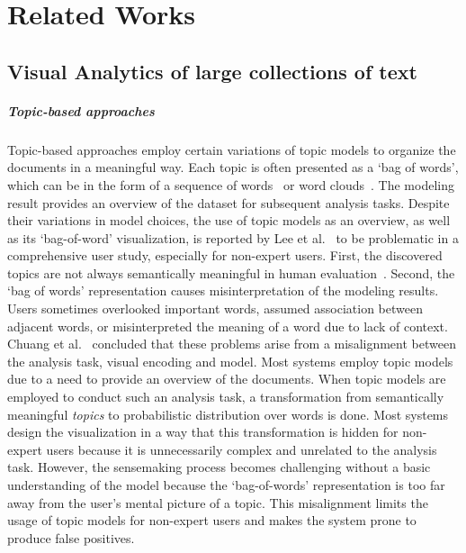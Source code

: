 \section{Related Works}
\subsection{Visual Analytics of large collections of text}
\subparagraph{Topic-based approaches} 
Topic-based approaches employ certain variations of topic models to organize the documents in a meaningful way.
Each topic is often presented as a `bag of words', which can be in the form of a sequence of words~\cite{yang2017vistopic, cho2016vairoma, dou2013hierarchicaltopics,yan2019clfsemi,han2022hisva, alexander2014serendip, lee2012ivisclustering} or word clouds~\cite{oelke2014topiccoin, cho2016vairoma}.
The modeling result provides an overview of the dataset for subsequent analysis tasks. 
Despite their variations in model choices, the use of topic models as an overview, as well as its `bag-of-word' visualization, is reported by Lee et al.~\cite{lee2017humantopicmodel} to be problematic in a comprehensive user study, especially for non-expert users.
First, the discovered topics are not always semantically meaningful in human evaluation~\cite{chang2009reading}.
Second, the `bag of words' representation causes misinterpretation of the modeling results.
Users sometimes overlooked important words, assumed association between adjacent words, or misinterpreted the meaning of a word due to lack of context.
Chuang et al.~\cite{chuang2012interpretation} concluded that these problems arise from a misalignment between the analysis task, visual encoding and model.
Most systems employ topic models due to a need to provide an overview of the documents.
When topic models are employed to conduct such an analysis task, a transformation from semantically meaningful \textit{topics} to probabilistic distribution over words is done.
Most systems design the visualization in a way that this transformation is hidden for non-expert users because it is unnecessarily complex and unrelated to the analysis task.
However, the sensemaking process becomes challenging without a basic understanding of the model because the `bag-of-words' representation is too far away from the user's mental picture of a topic.
This misalignment limits the usage of topic models for non-expert users and makes the system prone to produce false positives.

